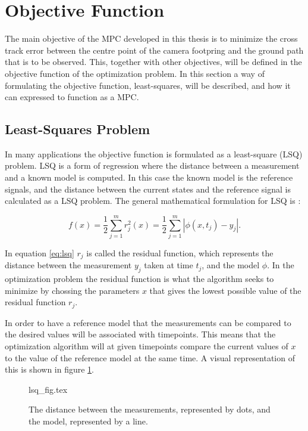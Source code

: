 \section{Objective Function}
\label{ch:objective_function}

The main objective of the MPC developed in this thesis is to minimize the cross track error between the centre point of the camera footpring and the ground path that is to be observed. This, together with other objectives, will be defined in the objective function of the optimization problem. In this section a way of formulating the objective function, least-squares, will be described, and how it can expressed to function as a MPC.


\subsection{Least-Squares Problem}

In many applications the objective function is formulated as a least-square (LSQ) problem. LSQ is a form of regression where the distance between a measurement and a known model is computed. In this case the known model is the reference signals, and the distance between the current states and the reference signal is calculated as a LSQ problem. The general mathematical formulation for LSQ is \cite{nocedalOPTIMIZATION}:

\begin{equation}
	\label{eq:lsq}
	f(x) = \frac{1}{2} \sum_{j=1}^m r_j^2(x) = \frac{1}{2} \sum_{j=1}^m |\phi(x, t_j) - y_j|.
\end{equation}

In equation \ref{eq:lsq} $r_j$ is called the residual function, which represents the distance between the measurement $y_j$ taken at time $t_j$, and the model $\phi$. In the optimization problem the residual function is what the algorithm seeks to minimize by chossing the parameters $x$ that gives the lowest possible value of the residual function $r_j$.

In order to have a reference model that the measurements can be compared to the desired values will be associated with timepoints. This means that the optimization algorithm will at given timepoints compare the current values of $x$ to the value of the reference model at the same time. A visual representation of this is shown in figure \ref{fig:lsq}.

\begin{figure}
	{lsq_fig.tex}
	\caption{The distance between the measurements, represented by dots, and the model, represented by a line.}
	\label{fig:lsq}
\end{figure}


